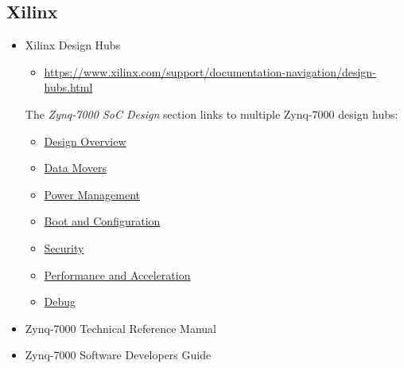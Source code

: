 \subsection{Xilinx}
%
\begin{itemize}
\item Xilinx Design Hubs
\begin{itemize}
\item \href{https://www.xilinx.com/support/documentation-navigation/design-hubs.html}
{https://www.xilinx.com/support/documentation-navigation/design-hubs.html}
\end{itemize}
%
The \emph{Zynq-7000 SoC Design} section links to multiple Zynq-7000 design hubs:
\begin{itemize}
\item \href{https://www.xilinx.com/support/documentation-navigation/design-hubs/dh0050-zynq-7000-design-overview-hub.html}{Design Overview}
\item \href{https://www.xilinx.com/support/documentation-navigation/design-hubs/dh0051-zynq-7000-data-movement-hub.html}{Data Movers}
\item \href{https://www.xilinx.com/support/documentation-navigation/design-hubs/dh0052-zynq-7000-power-management-hub.html}{Power Management}
\item \href{https://www.xilinx.com/support/documentation-navigation/design-hubs/dh0053-zynq-7000-boot-and-config-hub.html}{Boot and Configuration}
\item \href{https://www.xilinx.com/support/documentation-navigation/design-hubs/dh0056-zynq-7000-security-hub.html}{Security}
\item \href{https://www.xilinx.com/support/documentation-navigation/design-hubs/dh0054-zynq-7000-performance-and-benchmarks-hub.html}{Performance and Acceleration}
\item \href{https://www.xilinx.com/support/documentation-navigation/design-hubs/dh0055-zynq-7000-debug-hub.html}{Debug}
\end{itemize}
%
\item Zynq-7000 Technical Reference Manual~\cite{Xilinx_UG585_2018}
\item Zynq-7000 Software Developers Guide~\cite{Xilinx_UG821_2015}
\end{itemize}

